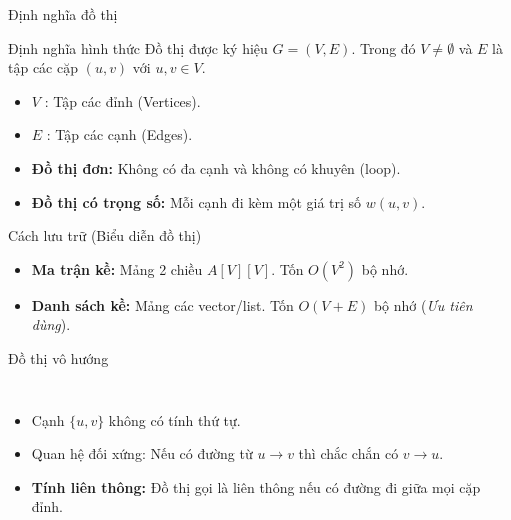 \documentclass{beamer}
\begin{document}
\begin{frame}{Định nghĩa đồ thị}

\begin{block}{Định nghĩa hình thức}
Đồ thị được ký hiệu $G=(V,E)$. Trong đó $V \neq \emptyset$ và $E$ là tập các cặp $(u, v)$ với $u, v \in V$.
\end{block}

\pause

\begin{itemize}
\item $V$ : Tập các đỉnh (Vertices).
\item $E$ : Tập các cạnh (Edges).
\item \textbf{Đồ thị đơn:} Không có đa cạnh và không có khuyên (loop).
\item \textbf{Đồ thị có trọng số:} Mỗi cạnh đi kèm một giá trị số $w(u, v)$.
\end{itemize}

\pause

\begin{exampleblock}{Cách lưu trữ (Biểu diễn đồ thị)}
\begin{itemize}
    \item \textbf{Ma trận kề:} Mảng 2 chiều $A[V][V]$. Tốn $O(V^2)$ bộ nhớ.
    \item \textbf{Danh sách kề:} Mảng các vector/list. Tốn $O(V+E)$ bộ nhớ (\textit{Ưu tiên dùng}).
\end{itemize}
\end{exampleblock}

\end{frame}


\begin{frame}{Đồ thị vô hướng}

\begin{columns}

\begin{itemize}
\item Cạnh $\{u,v\}$ không có tính thứ tự.
\item Quan hệ đối xứng: Nếu có đường từ $u \to v$ thì chắc chắn có $v \to u$.
\item \textbf{Tính liên thông:} Đồ thị gọi là liên thông nếu có đường đi giữa mọi cặp đỉnh.
\end{itemize}



\end{columns}

\end{frame}
\end{document}
